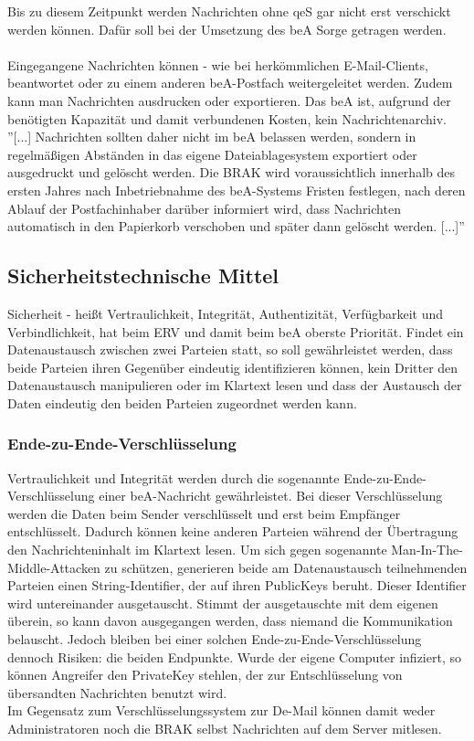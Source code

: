 Bis zu diesem Zeitpunkt werden Nachrichten ohne qeS gar nicht erst verschickt werden können. Dafür soll bei der Umsetzung des beA Sorge getragen werden. \\
\\
Eingegangene Nachrichten können - wie bei herkömmlichen E-Mail-Clients, beantwortet oder zu einem anderen beA-Postfach weitergeleitet werden. Zudem kann man Nachrichten ausdrucken oder exportieren. Das beA ist, aufgrund der benötigten Kapazität und damit verbundenen Kosten, kein Nachrichtenarchiv. ''[...] Nachrichten sollten daher nicht im beA belassen werden, sondern in regelmäßigen Abständen in das eigene Dateiablagesystem exportiert oder ausgedruckt und gelöscht werden. Die BRAK wird voraussichtlich innerhalb des ersten Jahres nach Inbetriebnahme des beA-Systems Fristen festlegen, nach deren Ablauf der Postfachinhaber darüber informiert wird, dass Nachrichten automatisch in den Papierkorb verschoben und später dann gelöscht werden. [...]'' \textcite{bea:bea:brak3/2015}

\subsection{Sicherheitstechnische Mittel}
Sicherheit - heißt Vertraulichkeit, Integrität, Authentizität, Verfügbarkeit und Verbindlichkeit, hat beim ERV und damit beim beA oberste Priorität. Findet ein Datenaustausch zwischen zwei Parteien statt, so soll gewährleistet werden, dass beide Parteien ihren Gegenüber eindeutig identifizieren können, kein Dritter den Datenaustausch manipulieren oder im Klartext lesen und dass der Austausch der Daten eindeutig den beiden Parteien zugeordnet werden kann.

\subsubsection{Ende-zu-Ende-Verschlüsselung}
Vertraulichkeit und Integrität werden durch die sogenannte Ende-zu-Ende-Verschlüsselung einer beA-Nachricht gewährleistet. Bei dieser Verschlüsselung werden die Daten beim Sender verschlüsselt und erst beim Empfänger entschlüsselt. Dadurch können keine anderen Parteien während der Übertragung den Nachrichteninhalt im Klartext lesen. Um sich gegen sogenannte Man-In-The-Middle-Attacken zu schützen, generieren beide am Datenaustausch teilnehmenden Parteien einen String-Identifier, der auf ihren PublicKeys beruht. Dieser Identifier wird untereinander ausgetauscht. Stimmt der ausgetauschte mit dem eigenen überein, so kann davon ausgegangen werden, dass niemand die Kommunikation belauscht. Jedoch bleiben bei einer solchen Ende-zu-Ende-Verschlüsselung dennoch Risiken: die beiden Endpunkte. Wurde der eigene Computer infiziert, so können Angreifer den PrivateKey stehlen, der zur Entschlüsselung von übersandten Nachrichten benutzt wird. \\
Im Gegensatz zum Verschlüsselungssystem zur De-Mail können damit weder Administratoren noch die BRAK selbst Nachrichten auf dem Server mitlesen.

